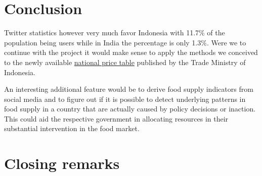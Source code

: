 \section*{Conclusion}
Twitter statistics however very much favor Indonesia with 11.7\% of the population being users while in India the percentage is only 1.3\%. Were we to continue with the project it would make sense to apply the methods we conceived to the newly available \href{http://www.kemendag.go.id/en/economic-profile/prices/national-price-table}{national price table} published by the Trade Ministry of Indonesia. 

An interesting additional feature would be to derive food supply indicators from social media and to figure out if it is possible to detect underlying patterns in food supply in a country that are actually caused by policy decisions or inaction. This could aid the respective government in allocating resources in their substantial intervention in the food market.

\section*{Closing remarks}